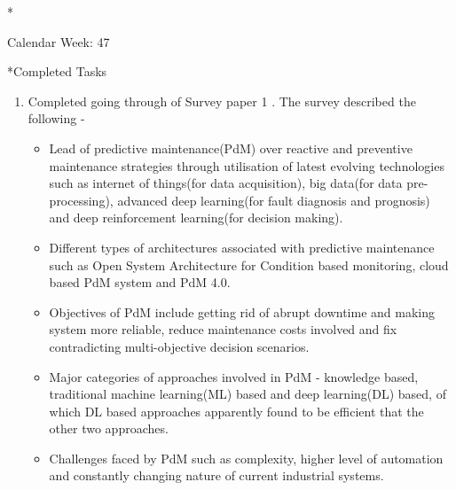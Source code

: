 \documentclass[11pt,a4paper]{article}
\begin{document}
\newpage

\begin{section}*{Calendar Week: 47 \hfill \date{19 November, 2020}}

\begin{subsection}*{Completed Tasks}
    \begin{enumerate}
        \item
            Completed going through of Survey paper 1 \cite{survey11}. The survey described the following -
            \begin{itemize}
                \item Lead of predictive maintenance(PdM) over reactive and preventive maintenance strategies through utilisation of latest evolving technologies such as internet of things(for data acquisition),  big data(for data pre-processing), advanced deep learning(for fault diagnosis and prognosis) and deep reinforcement learning(for decision making).  
                \item Different types of architectures associated with predictive maintenance such as Open System Architecture for Condition based monitoring, cloud based PdM system and PdM 4.0.
                \item Objectives of PdM include getting rid of abrupt downtime and making system more reliable, reduce maintenance costs involved and fix contradicting multi-objective decision scenarios.
                \item Major categories of approaches involved in PdM - knowledge based, traditional machine learning(ML) based and deep learning(DL) based, of which DL based approaches apparently found to be efficient that the other two approaches.
                \item Challenges faced by PdM such as complexity, higher level of automation and constantly changing nature of current industrial systems.  
            \end{itemize}
             

\end{enumerate}
\end{subsection}
\end{section}
\end{document}
